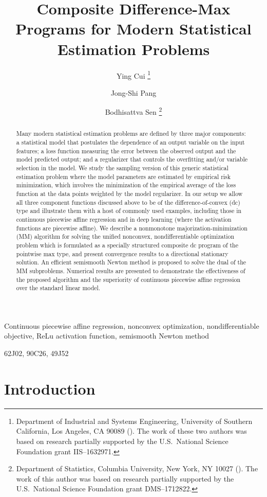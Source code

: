 \documentclass{siamart}
\title{
Composite Difference-Max
Programs for Modern Statistical Estimation Problems}
\author{Ying Cui \thanks{Department of Industrial and
Systems Engineering, University of Southern California, Los Angeles, CA 90089
(\email{yingcui@usc.edu; jongship@usc.edu}).  The work of these two authors was based on research partially
supported by the U.S.\ National Science Foundation grant IIS--1632971.}
\and Jong-Shi Pang \footnotemark[1]
\and Bodhisattva Sen \thanks{Department of Statistics,
Columbia University, New York, NY 10027 (\email{bodhi@stat.columbia.edu}).
The work of this author was based on research partially
supported by the U.S.\ National Science Foundation grant DMS--1712822.}}
\begin{document}
\maketitle


\begin{abstract}
Many modern statistical estimation problems are defined by three major components: a statistical model that postulates the dependence of an output variable on the input features; a loss function measuring the error between the observed output and the model predicted output; and a regularizer that controls the overfitting and/or variable selection in the model. We study the sampling version of this generic statistical estimation problem where the model parameters are estimated by empirical risk minimization, which involves
the minimization of the empirical average of the loss function at the data points weighted by the model regularizer. In our setup we allow all three component functions discussed above to be of the difference-of-convex (dc) type and illustrate them with a host of commonly used examples, including those in continuous piecewise affine regression and in deep learning (where the activation functions are piecewise affine).
We describe a nonmonotone majorization-minimization (MM) algorithm for solving the unified
nonconvex, nondifferentiable optimization problem which is formulated as a specially structured
composite dc program of the pointwise max type, and present convergence results to a directional stationary
solution.  An efficient semismooth Newton method is proposed to solve the dual of the MM subproblems.
Numerical results are presented to demonstrate the effectiveness of the proposed algorithm and the superiority of continuous piecewise affine regression over the standard linear model.
\end{abstract}

\begin{keywords}
Continuous piecewise affine regression, nonconvex optimization, nondifferentiable objective, ReLu activation function, semismooth
Newton method
\end{keywords}
\begin{AMS}
62J02, %
90C26, %
49J52 %
\end{AMS}

\section{Introduction}
\end{document}
